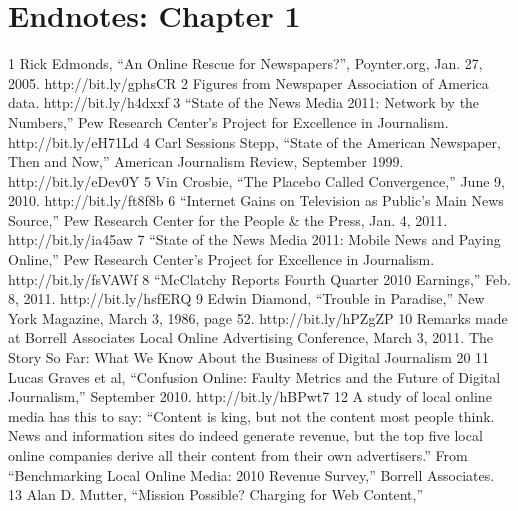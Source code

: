 \section{Endnotes: Chapter 1}
1 Rick Edmonds, ``An Online Rescue for Newspapers?'', Poynter.org, Jan. 27, 2005.
http://bit.ly/gphsCR
2 Figures from Newspaper Association of America data. http://bit.ly/h4dxxf
3 ``State of the News Media 2011: Network by the Numbers,'' Pew Research Center’s Project
for Excellence in Journalism. http://bit.ly/eH71Ld
4 Carl Sessions Stepp, ``State of the American Newspaper, Then and Now,'' American Journalism
Review, September 1999. http://bit.ly/eDev0Y
5 Vin Crosbie, ``The Placebo Called Convergence,'' June 9, 2010. http://bit.ly/ft8f8b
6 ``Internet Gains on Television as Public’s Main News Source,'' Pew Research Center for the
People & the Press, Jan. 4, 2011. http://bit.ly/ia45aw
7 ``State of the News Media 2011: Mobile News and Paying Online,'' Pew Research Center’s
Project for Excellence in Journalism. http://bit.ly/fsVAWf
8 ``McClatchy Reports Fourth Quarter 2010 Earnings,'' Feb. 8, 2011. http://bit.ly/hsfERQ
9 Edwin Diamond, ``Trouble in Paradise,'' New York Magazine, March 3, 1986, page 52.
http://bit.ly/hPZgZP
10 Remarks made at Borrell Associates Local Online Advertising Conference, March 3, 2011.
The Story So Far: What We Know About the Business of Digital Journalism
20
11 Lucas Graves et al, ``Confusion Online: Faulty Metrics and the Future of Digital Journalism,''
September 2010. http://bit.ly/hBPwt7
12 A study of local online media has this to say: ``Content is king, but not the content most
people think. News and information sites do indeed generate revenue, but the top five local
online companies derive all their content from their own advertisers.'' From ``Benchmarking
Local Online Media: 2010 Revenue Survey,'' Borrell Associates.
13 Alan D. Mutter, ``Mission Possible? Charging for Web Content,''


